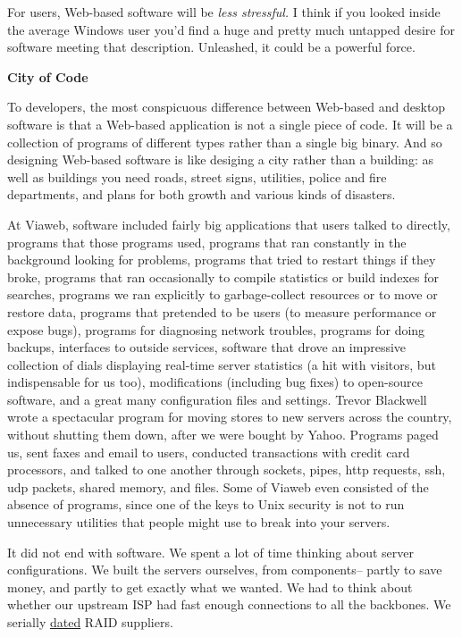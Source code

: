 For users, Web-based software will be \emph{less stressful.} I think if
you looked inside the average Windows user you'd find a huge and pretty
much untapped desire for software meeting that description. Unleashed,
it could be a powerful force.

\textbf{City of Code}

To developers, the most conspicuous difference between Web-based and
desktop software is that a Web-based application is not a single piece
of code. It will be a collection of programs of different types rather
than a single big binary. And so designing Web-based software is like
desiging a city rather than a building: as well as buildings you need
roads, street signs, utilities, police and fire departments, and plans
for both growth and various kinds of disasters.

At Viaweb, software included fairly big applications that users talked
to directly, programs that those programs used, programs that ran
constantly in the background looking for problems, programs that tried
to restart things if they broke, programs that ran occasionally to
compile statistics or build indexes for searches, programs we ran
explicitly to garbage-collect resources or to move or restore data,
programs that pretended to be users (to measure performance or expose
bugs), programs for diagnosing network troubles, programs for doing
backups, interfaces to outside services, software that drove an
impressive collection of dials displaying real-time server statistics (a
hit with visitors, but indispensable for us too), modifications
(including bug fixes) to open-source software, and a great many
configuration files and settings. Trevor Blackwell wrote a spectacular
program for moving stores to new servers across the country, without
shutting them down, after we were bought by Yahoo. Programs paged us,
sent faxes and email to users, conducted transactions with credit card
processors, and talked to one another through sockets, pipes, http
requests, ssh, udp packets, shared memory, and files. Some of Viaweb
even consisted of the absence of programs, since one of the keys to Unix
security is not to run unnecessary utilities that people might use to
break into your servers.

It did not end with software. We spent a lot of time thinking about
server configurations. We built the servers ourselves, from components--
partly to save money, and partly to get exactly what we wanted. We had
to think about whether our upstream ISP had fast enough connections to
all the backbones. We serially
\href{http://groups.google.com/groups?selm=6hdipo\%243o0\%241\%40FreeBSD.csie.NCTU.edu.tw}{dated}
RAID suppliers.


